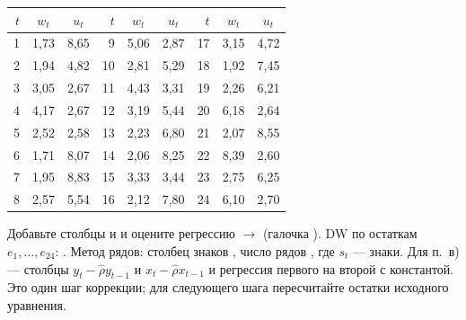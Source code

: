\begin{center}
\small
\begin{tabular*}{\linewidth}{@{\extracolsep{\fill}}rccrccrcc@{}}
\toprule
$t$ & $w_t$ & $u_t$ & $t$ & $w_t$ & $u_t$ & $t$ & $w_t$ & $u_t$ \\
\midrule
1 & 1,73 & 8,65 &  9 & 5,06 & 2,87 & 17 & 3,15 & 4,72 \\
2 & 1,94 & 4,82 & 10 & 2,81 & 5,29 & 18 & 1,92 & 7,45 \\
3 & 3,05 & 2,67 & 11 & 4,43 & 3,31 & 19 & 2,26 & 6,21 \\
4 & 4,17 & 2,67 & 12 & 3,19 & 5,44 & 20 & 6,18 & 2,64 \\
5 & 2,52 & 2,58 & 13 & 2,23 & 6,80 & 21 & 2,07 & 8,55 \\
6 & 1,71 & 8,07 & 14 & 2,06 & 8,25 & 22 & 8,39 & 2,60 \\
7 & 1,95 & 8,83 & 15 & 3,33 & 3,44 & 23 & 2,75 & 6,25 \\
8 & 2,57 & 5,54 & 16 & 2,12 & 7,80 & 24 & 6,10 & 2,70 \\
\bottomrule
\end{tabular*}
\end{center}

\begin{excel}
Добавьте столбцы  и  и оцените регрессию
 $\to$  (галочка ). DW по
остаткам $e_1, \dots, e_{24}$: .
Метод рядов: столбец знаков , число рядов
, где $s_t$ — знаки.
Для п.~в) — столбцы $y_t - \widehat{\rho}y_{t-1}$ и
$x_t - \widehat{\rho}x_{t-1}$ и регрессия первого на второй с константой. Это один шаг коррекции; для следующего шага пересчитайте остатки исходного уравнения.
\end{excel}

